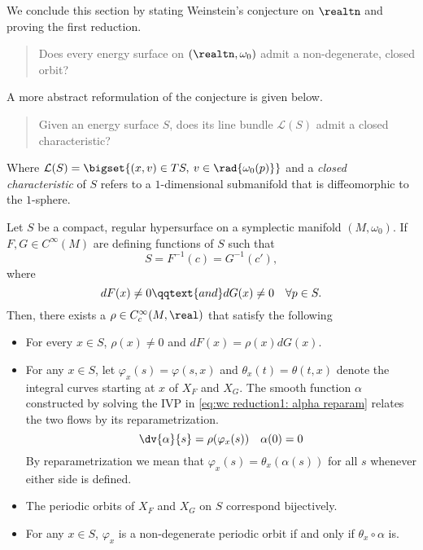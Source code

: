 \documentclass[../main-v2-manifolds.tex]{subfiles}
\begin{document}
We conclude this section by stating Weinstein's conjecture on $\realtn$ and proving the first reduction.
\begin{quote}
    Does every energy surface on $(\realtn,\omega_0)$ admit a non-degenerate, closed orbit?
\end{quote}
A more abstract reformulation of the conjecture is given below.
\begin{quote}
    Given an energy surface $S$, does its line bundle $\mathcal{L}(S)$ admit a closed characteristic?
\end{quote}
Where $\mathcal{L}(S) = \bigset{(x,v)\in TS,\:  v\in \rad{\omega_0(p)}}$ and a \emph{closed characteristic} of $S$ refers to a $1$-dimensional submanifold that is diffeomorphic to the $1$-sphere.
\begin{wts}\label{thm:wc reduction 1 hamiltonian}
    Let $S$ be a compact, regular hypersurface on a symplectic manifold $(M,\omega_0)$. If $F, G\in C^\infty(M)$ are defining functions of $S$ such that
    \[S = F^{-1}(c) = G^{-1}(c'),\]
    where 
    \[dF(x)\neq 0\qqtext{and}dG(x)\neq 0\quad\forall p\in S.\]
    Then, there exists a $\rho\in C_c^\infty(M,\real)$ that satisfy the following
    \begin{itemize}
        \item For every $x\in S$, $\rho(x)\neq 0$ and $dF(x) = \rho(x) dG(x)$.
        \item For any $x\in S$, let $\varphi_x(s) = \varphi(s,x)$ and $\theta_x(t) = \theta(t,x)$ denote the integral curves starting at $x$ of $X_F$ and $X_G$. The smooth function $\alpha$ constructed by solving the IVP in \cref{eq:wc reduction1: alpha reparam} relates the two flows by its reparametrization.
        \begin{equation}
            \dv{\alpha}{s} = \rho(\varphi_x(s))\quad\alpha(0)=0
            \label{eq:wc reduction1: alpha reparam}
        \end{equation}
        By reparametrization we mean that $\varphi_x(s) = \theta_x(\alpha(s))$ for all $s$ whenever either side is defined.
        \item The periodic orbits of $X_{F}$ and $X_G$ on $S$ correspond bijectively.
        \item For any $x\in S$, $\varphi_x$ is a non-degenerate periodic orbit if and only if $\theta_x\circ\alpha$ is.
    \end{itemize}
\end{wts}
\end{document}
